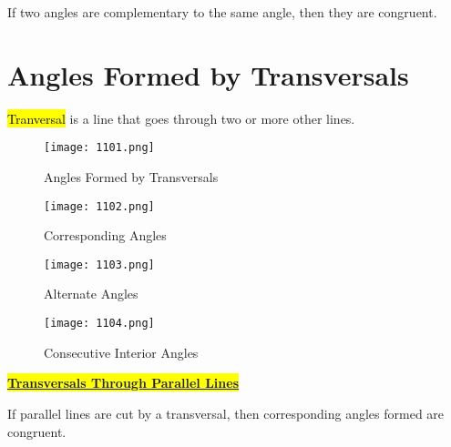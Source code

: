 \vspace{.3cm}

\begin{tcolorbox}[colback=Orange!5!white,colframe=Orange!75!black,title=Congruent Complements Theorem]
  If two angles are complementary to the same angle, then they are congruent.
\end{tcolorbox}

\newpage

\section{Angles Formed by Transversals}

\hl{Tranversal} is a line that goes through two or more other lines.

\begin{figure}[htb!]
  \centering
  \texttt{[image: 1101.png]}
  \caption{Angles Formed by Transversals}
\end{figure}

\begin{figure}[htb!]
  \centering
  \texttt{[image: 1102.png]}
  \caption{Corresponding Angles}
\end{figure}

\newpage

\begin{figure}[htb!]
  \centering
  \texttt{[image: 1103.png]}
  \caption{Alternate Angles}
\end{figure}

\begin{figure}[htb!]
  \centering
  \texttt{[image: 1104.png]}
  \caption{Consecutive Interior Angles}
\end{figure}

\newpage

\centerline{\colorbox{yellow}{\textbf{\underline{\Large Transversals Through Parallel Lines}}}}

\vspace{.5cm}

\begin{tcolorbox}[colback=RoyalPurple!5!white,colframe=RoyalPurple!75!black,title=Corresponding Angles Postulate]
  If parallel lines are cut by a transversal, then corresponding angles formed are congruent.
\end{tcolorbox}

